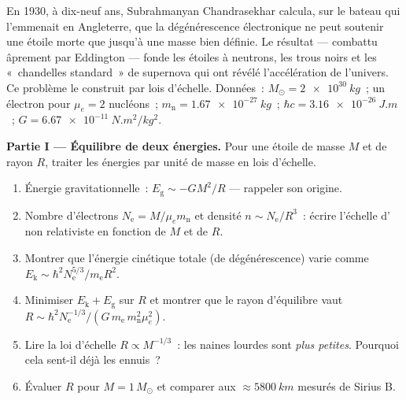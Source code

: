 \begin{problem}\label{pb:b3:quantum-statistics:1}
En 1930, à dix-neuf ans, Subrahmanyan Chandrasekhar calcula, sur le
bateau qui l'emmenait en Angleterre, que la dégénérescence
électronique ne peut soutenir une étoile morte que jusqu'à une masse
bien définie. Le résultat --- combattu âprement par Eddington ---
fonde les étoiles à neutrons, les trous noirs et les «~chandelles
standard~» de supernova qui ont révélé l'accélération de l'univers.
Ce problème le construit par lois d'échelle. Données~: $M_\odot =
\qty{2e30}{kg}$~; un électron pour $\mu_e = 2$ nucléons~; $m_{\text{
n}} = \qty{1.67e-27}{kg}$~; $\hbar c = \qty{3.16e-26}{J.m}$~; $G =
\qty{6.67e-11}{N.m^2/kg^2}$.

\medskip\noindent\textbf{Partie I --- Équilibre de deux énergies.}
Pour une étoile de masse $M$ et de rayon $R$, traiter les énergies
par unité de masse en lois d'échelle.
\begin{enumerate}
  \item Énergie gravitationnelle~: $E_{\text{g}} \sim -GM^2/R$ ---
        rappeler son origine.
  \item Nombre d'électrons $N_{\text{e}} = M/\mu_e m_{\text{n}}$ et
        densité $n \sim N_{\text{e}}/R^3$~: écrire l'échelle
        d' non relativiste en fonction de $M$
        et de $R$.
  \item Montrer que l'énergie cinétique totale (de dégénérescence)
        varie comme
        $E_{\text{k}} \sim \hbar^2N_{\text{e}}^{5/3}/m_{\text{e}}
        R^2$.
  \item Minimiser $E_{\text{k}} + E_{\text{g}}$ sur $R$ et montrer
        que le rayon d'équilibre vaut
        $R \sim \hbar^2 N_{\text{e}}^{-1/3}/(G\,m_{\text{e}}\,
        m_{\text{n}}^2\mu_e^2)$.
  \item Lire la loi d'échelle $R \propto M^{-1/3}$~: les naines
        lourdes sont \emph{plus petites}. Pourquoi cela sent-il
        déjà les ennuis~?
  \item Évaluer $R$ pour $M = 1\,M_\odot$ et comparer aux
        $\approx\qty{5800}{km}$ mesurés de Sirius B.
\end{enumerate}


\end{problem}
